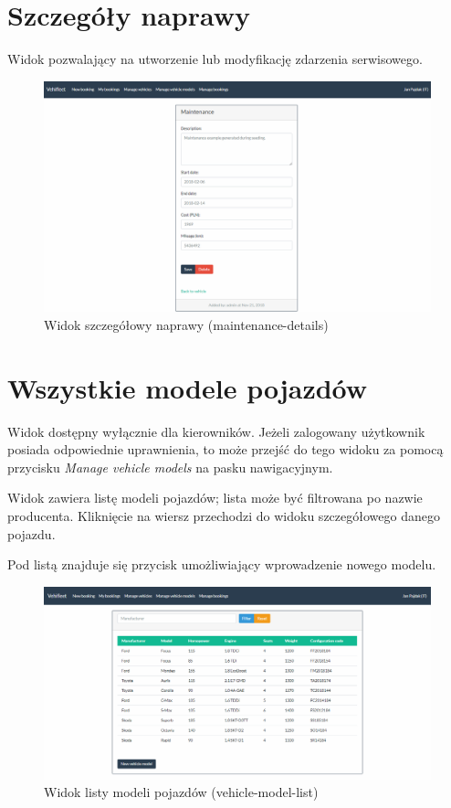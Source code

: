 \documentclass[eng,printmode,openany]{mgr}
\begin{document}
\begin{appendices}
		\section{Szczegóły naprawy}
		Widok pozwalający na utworzenie lub modyfikację zdarzenia serwisowego.
		\begin{figure}[H]
			\centering
			\includegraphics[scale=0.32]{images/views/maintenance-detail.png}
			\caption{Widok szczegółowy naprawy (maintenance-details)}
		\end{figure}
		
		\newpage
		\section{Wszystkie modele pojazdów}
		Widok dostępny wyłącznie dla kierowników. Jeżeli zalogowany użytkownik posiada odpowiednie uprawnienia, to może przejść do tego widoku za pomocą przycisku \textit{Manage vehicle models} na pasku nawigacyjnym.
		
		Widok zawiera listę modeli pojazdów; lista może być filtrowana po nazwie producenta. Kliknięcie na wiersz przechodzi do widoku szczegółowego danego pojazdu.
		
		Pod listą znajduje się przycisk umożliwiający wprowadzenie nowego modelu.
		\begin{figure}[H]
			\centering
			\includegraphics[width=\textwidth]{images/views/vehicle-model-list.png}
			\caption{Widok listy modeli pojazdów (vehicle-model-list)}
		\end{figure}
		

\end{appendices}
\end{document}
